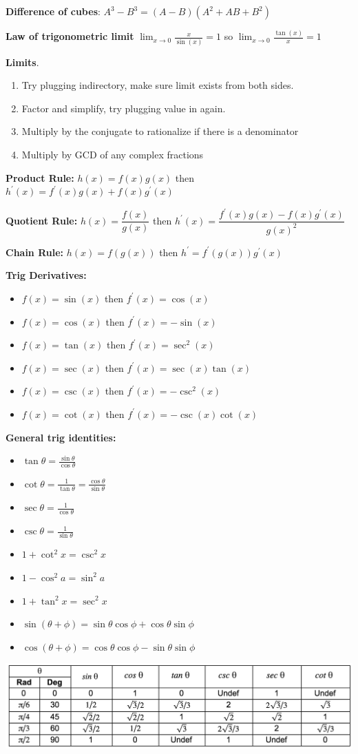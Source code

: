 \documentclass[11pt, letterpaper, twoside]{article}
\begin{document}
\textbf{Difference of cubes}: \(A^3-B^3=(A-B)(A^2+AB+B^2)\)

\textbf{Law of trigonometric limit} \(\lim_{x\to0}\frac{x}{\sin(x)}=1\) so \(\lim_{x\to0}\frac{\tan(x)}{x}=1\)

\textbf{Limits}. 
\begin{enumerate}
	\item Try plugging indirectory, make sure limit exists from both sides.
	\item Factor and simplify, try plugging value in again.
	\item Multiply by the conjugate to rationalize if there is a denominator
	\item Multiply by GCD of any complex fractions
\end{enumerate}

\vspace{0.25cm}
\textbf{Product Rule:} \(h(x)=f(x)g(x)\) then \(h^\prime(x)=f^\prime(x)g(x)+f(x)g^\prime(x)\)

\vspace{0.1cm}
\textbf{Quotient Rule:} \(h(x)=\dfrac{f(x)}{g(x)}\) then \(h^\prime(x)=\dfrac{f^\prime(x)g(x)-f(x)g^\prime(x)}{g(x)^2}\)

\vspace{0.1cm}
\textbf{Chain Rule:} \(h(x)=f(g(x))\) then \(h^\prime=f^\prime(g(x))g^\prime(x)\)

\textbf{Trig Derivatives:}
\begin{itemize}
	\item \(f(x)=\sin(x)\) then \(f^\prime(x)=\cos(x)\)
	\item \(f(x)=\cos(x)\) then \(f^\prime(x)=-\sin(x)\)
	\item \(f(x)=\tan(x)\) then \(f^\prime(x)=\sec^2(x)\)
	\item \(f(x)=\sec(x)\) then \(f^\prime(x)=\sec(x)\tan(x)\)
	\item \(f(x)=\csc(x)\) then \(f^\prime(x)=-\csc^2(x)\)
	\item \(f(x)=\cot(x)\) then \(f^\prime(x)=-\csc(x)\cot(x)\)
\end{itemize}

\textbf{General trig identities:} 
\begin{itemize}
	\item \(\tan \theta = \frac{\sin\theta}{\cos\theta}\)
	\item \(\cot\theta=\frac{1}{\tan\theta}=\frac{\cos\theta}{\sin\theta}\)
	\item \(\sec\theta=\frac{1}{\cos\theta}\)
	\item \(\csc\theta=\frac{1}{\sin\theta}\)
	\item \(1+\cot^2x=\csc^2x\)
	\item \(1-\cos^2a=\sin^2a\)
	\item \(1+\tan^2x=\sec^2x\)
	\item \(\sin(\theta+\phi) = \sin\theta \cos\phi + \cos\theta\sin\phi\)
	\item \(\cos(\theta+\phi) = \cos\theta\cos\phi - \sin\theta\sin\phi\)
\end{itemize}

\includegraphics[width=\textwidth]{chart-of-common-trigonometric-ratios-new.jpg}
\end{document}

